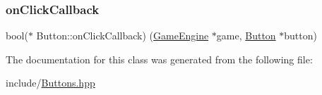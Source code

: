 \subsubsection{\texorpdfstring{onClickCallback}{onClickCallback}}
{\footnotesize\ttfamily bool($\ast$ Button\+::on\+Click\+Callback) (\mbox{\hyperlink{class_game_engine}{Game\+Engine}} $\ast$game, \mbox{\hyperlink{class_button}{Button}} $\ast$button)\hspace{0.3cm}{\ttfamily [protected]}}



The documentation for this class was generated from the following file\+:\begin{DoxyCompactItemize}
\item 
include/\mbox{\hyperlink{_buttons_8hpp}{Buttons.\+hpp}}\end{DoxyCompactItemize}
